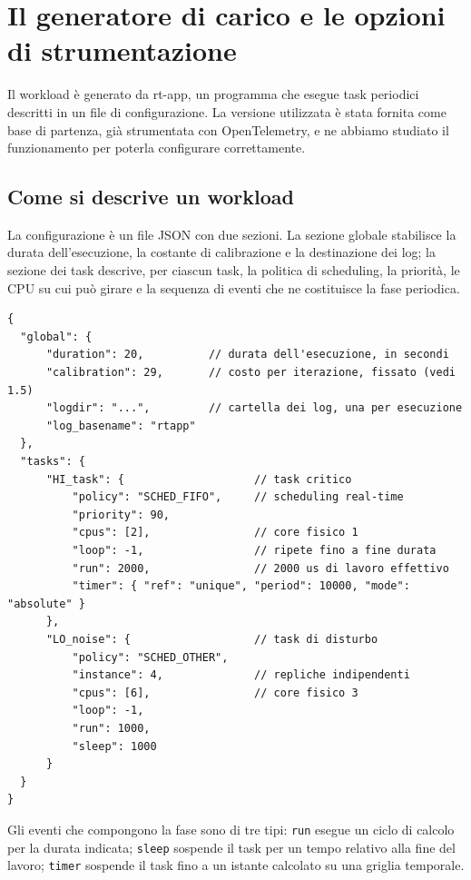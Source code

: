 
\section{Il generatore di carico e le opzioni di strumentazione}

Il workload \`e generato da rt-app, un programma che esegue task periodici descritti in un file di
configurazione. La versione utilizzata \`e stata fornita come base di partenza, gi\`a strumentata
con OpenTelemetry, e ne abbiamo studiato il funzionamento per poterla configurare correttamente.

\subsection{Come si descrive un workload}

La configurazione \`e un file JSON con due sezioni. La sezione globale stabilisce la durata
dell'esecuzione, la costante di calibrazione e la destinazione dei log; la sezione dei task
descrive, per ciascun task, la politica di scheduling, la priorit\`a, le CPU su cui pu\`o girare e
la sequenza di eventi che ne costituisce la fase periodica.

\begin{lstlisting}[caption={Struttura della configurazione: un task critico e un task di disturbo.}]
{
  "global": {
      "duration": 20,          // durata dell'esecuzione, in secondi
      "calibration": 29,       // costo per iterazione, fissato (vedi 1.5)
      "logdir": "...",         // cartella dei log, una per esecuzione
      "log_basename": "rtapp"
  },
  "tasks": {
      "HI_task": {                    // task critico
          "policy": "SCHED_FIFO",     // scheduling real-time
          "priority": 90,
          "cpus": [2],                // core fisico 1
          "loop": -1,                 // ripete fino a fine durata
          "run": 2000,                // 2000 us di lavoro effettivo
          "timer": { "ref": "unique", "period": 10000, "mode": "absolute" }
      },
      "LO_noise": {                   // task di disturbo
          "policy": "SCHED_OTHER",
          "instance": 4,              // repliche indipendenti
          "cpus": [6],                // core fisico 3
          "loop": -1,
          "run": 1000,
          "sleep": 1000
      }
  }
}
\end{lstlisting}

Gli eventi che compongono la fase sono di tre tipi: \texttt{run} esegue un ciclo di calcolo per la
durata indicata; \texttt{sleep} sospende il task per un tempo relativo alla fine del lavoro;
\texttt{timer} sospende il task fino a un istante calcolato su una griglia temporale.

